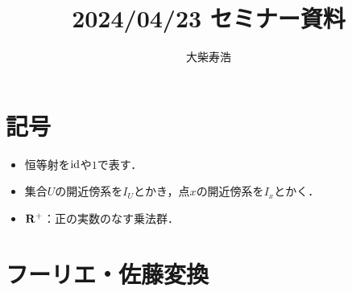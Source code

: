 





\def\inner<#1>{\langle #1 \rangle}








\title{2024/04/23 セミナー資料}
\author{大柴寿浩}
\date{}

\maketitle

\section*{記号}
\begin{itemize}
    \item 恒等射を\(\mathop{\mathrm{id}}\nolimits\)や\(1\)で表す．
    \item 集合\(U\)の開近傍系を\(I_U\)とかき，点\(x\)の開近傍系を\(I_x\)とかく．
    \item \(\mathbf{R}^+\)：正の実数のなす乗法群．
\end{itemize}

\section{フーリエ・佐藤変換{\cite[section 3.7]{KS90}}}

